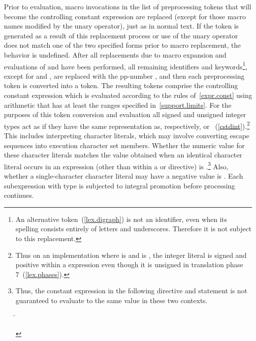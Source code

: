 \pnum
Prior to evaluation,
macro invocations in the list of preprocessing tokens
that will become the controlling constant expression
are replaced
(except for those macro names modified by the
unary operator),
just as in normal text.
If the token
is generated as a result of this replacement process
or use of the
unary operator does not match one of the two specified forms
prior to macro replacement,
the behavior is undefined.
After all replacements due to macro expansion and
evaluations of  and
have been performed,
all remaining identifiers and keywords\footnote{An alternative
token~(\ref{lex.digraph}) is not an identifier,
even when its spelling consists entirely of letters and underscores.
Therefore it is not subject to this replacement.},
except for
and
,
are replaced with the pp-number
,
and then each preprocessing token is converted into a token.
The resulting tokens comprise the controlling constant expression
which is evaluated according to the rules of~\ref{expr.const}
using arithmetic that has at least the ranges specified
in~\ref{support.limits}. For the purposes of this token conversion and evaluation
all signed and unsigned integer types
act as if they have the same representation as, respectively,
 or ~(\ref{cstdint}).\footnote{Thus on an
implementation where  is 
and  is ,
the integer literal  is signed and positive within a 
expression even though it is unsigned in translation phase
7~(\ref{lex.phases}).}
This includes interpreting character literals, which may involve
converting escape sequences into execution character set members.
Whether the numeric value for these character literals
matches the value obtained when an identical character literal
occurs in an expression
(other than within a
or
directive)
is .\footnote{Thus, the constant expression in the following
directive and
statement is not guaranteed to evaluate to the same value in these two
contexts.
\begin{tabbing}
\hspace{.6in}\=\kill%
\>\\
\>
\end{tabbing}
}
Also, whether a single-character character literal may have a negative
value is .
Each subexpression with type
is subjected to integral promotion before processing continues.

